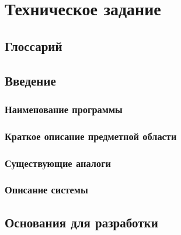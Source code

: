 \documentclass{bmstu-gost-7-32}
\begin{document}
\chapter*{Техническое задание}

\section*{Глоссарий}

\section{Введение}


\subsection{Наименование программы}

\subsection{Краткое описание предметной области}

\subsection{Существующие аналоги}

\subsection{Описание системы}

\section{Основания для разработки}

\end{document}
